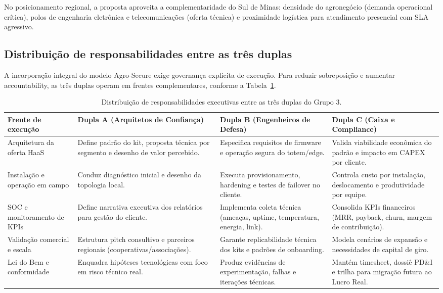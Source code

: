 No posicionamento regional, a proposta aproveita a complementaridade do Sul de Minas: densidade do agronegócio (demanda operacional crítica), polos de engenharia eletrônica e telecomunicações (oferta técnica) e proximidade logística para atendimento presencial com SLA agressivo.

\subsection{Distribuição de responsabilidades entre as três duplas}

A incorporação integral do modelo Agro-Secure exige governança explícita de execução. Para reduzir sobreposição e aumentar accountability, as três duplas operam em frentes complementares, conforme a Tabela~\ref{tab:responsabilidades-duplas}.

\begin{table}[htb]
\centering
\caption{Distribuição de responsabilidades executivas entre as três duplas do Grupo 3.}
\label{tab:responsabilidades-duplas}
\begin{tabular}{|p{}|p{}|p{}|p{}|}
\hline
\textbf{Frente de execução} & \textbf{Dupla A (Arquitetos de Confiança)} & \textbf{Dupla B (Engenheiros de Defesa)} & \textbf{Dupla C (Caixa e Compliance)} \\
\hline
Arquitetura da oferta HaaS & Define padrão do kit, proposta técnica por segmento e desenho de valor percebido. & Especifica requisitos de firmware e operação segura do totem/edge. & Valida viabilidade econômica do padrão e impacto em CAPEX por cliente. \\
\hline
Instalação e operação em campo & Conduz diagnóstico inicial e desenho da topologia local. & Executa provisionamento, hardening e testes de failover no cliente. & Controla custo por instalação, deslocamento e produtividade por equipe. \\
\hline
SOC e monitoramento de KPIs & Define narrativa executiva dos relatórios para gestão do cliente. & Implementa coleta técnica (ameaças, uptime, temperatura, energia, link). & Consolida KPIs financeiros (MRR, payback, churn, margem de contribuição). \\
\hline
Validação comercial e escala & Estrutura pitch consultivo e parceiros regionais (cooperativas/associações). & Garante replicabilidade técnica dos kits e padrões de onboarding. & Modela cenários de expansão e necessidades de capital de giro. \\
\hline
Lei do Bem e conformidade & Enquadra hipóteses tecnológicas com foco em risco técnico real. & Produz evidências de experimentação, falhas e iterações técnicas. & Mantém timesheet, dossiê PD\&I e trilha para migração futura ao Lucro Real. \\
\hline
\end{tabular}
\end{table}

